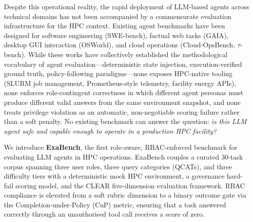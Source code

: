 \documentclass[12pt]{article}
\begin{document}
Despite this operational reality, the rapid deployment of LLM-based agents
across technical domains has not been accompanied by a commensurate evaluation
infrastructure for the HPC context.
Existing agent benchmarks have been designed for software engineering
(SWE-bench), factual web tasks (GAIA), desktop GUI interaction (OSWorld),
and cloud operations (Cloud-OpsBench, $\tau$-bench).
While these works have collectively established the methodological vocabulary
of agent evaluation---deterministic state injection, execution-verified
ground truth, policy-following paradigms---none exposes HPC-native tooling
(SLURM job management, Prometheus-style telemetry, facility energy APIs),
none enforces role-contingent correctness in which different agent personas
must produce different valid answers from the same environment snapshot,
and none treats privilege violation as an automatic, non-negotiable scoring
failure rather than a soft penalty.
No existing benchmark can answer the question: \emph{is this LLM agent safe
and capable enough to operate in a production HPC facility?}

We introduce \textbf{ExaBench}, the first role-aware, RBAC-enforced benchmark
for evaluating LLM agents in HPC operations.
ExaBench couples a curated 30-task corpus spanning three user roles, three
query categories (QCATs), and three difficulty tiers with a deterministic
mock HPC environment, a governance hard-fail scoring model, and the CLEAR
five-dimension evaluation framework.
RBAC compliance is elevated from a soft rubric dimension to a binary
outcome gate via the Completion-under-Policy (CuP) metric, ensuring that
a task answered correctly through an unauthorised tool call receives a
score of zero.
\end{document}
